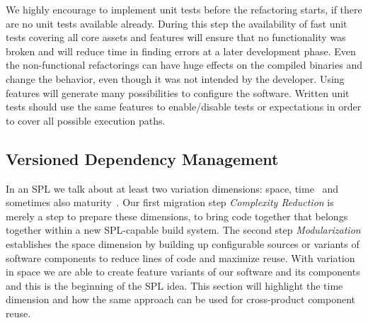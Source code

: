 We highly encourage to implement unit tests before the refactoring starts, if
there are no unit tests available already. During this step the availability of
fast unit tests covering all core assets and features will ensure that no
functionality was broken and will reduce time in finding errors at a later
development phase. Even the non-functional refactorings can have huge effects on
the compiled binaries and change the behavior, even though it was not intended
by the developer. Using features will generate many possibilities to configure
the software. Written unit tests should use the same features to enable/disable
tests or expectations in order to cover all possible execution paths.

\subsection{Versioned Dependency Management}\label{dependencies}

In an SPL we talk about at least two variation dimensions: space,
time~\cite{appliedSPLE} and sometimes also maturity~\cite{bigleverwhitepaper}.
Our first migration step \textit{Complexity Reduction} is merely a step to
prepare these dimensions, to bring code together that belongs together within a
new SPL-capable build system. The second step \textit{Modularization}
establishes the space dimension by building up configurable sources or variants
of software components to reduce lines of code and maximize reuse. With
variation in space we are able to create feature variants of our software and
its components and this is the beginning of the SPL idea. This section will
highlight the time dimension and how the same approach can be used for
cross-product component reuse.

